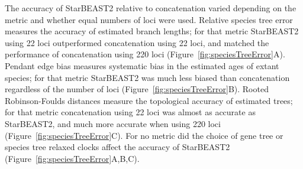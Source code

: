 \documentclass[12pt]{article}
\begin{document}
The accuracy of StarBEAST2 relative to concatenation varied depending on the
metric and whether equal numbers of loci were used. Relative species tree error
measures the accuracy of estimated branch lengths; for that metric StarBEAST2
using 22 loci outperformed concatenation using 22 loci, and matched the
performance of concatenation using 220 loci
(Figure~\ref{fig:speciesTreeError}A). Pendant edge bias measures systematic bias
in the estimated ages of extant species; for that metric StarBEAST2 was much
less biased than concatenation regardless of the number of loci
(Figure~\ref{fig:speciesTreeError}B). Rooted Robinson-Foulds distances measure
the topological accuracy of estimated trees; for that metric concatenation using
22 loci was almost as accurate as StarBEAST2, and much more accurate when using
220 loci (Figure~\ref{fig:speciesTreeError}C). For no metric did the choice of
gene tree or species tree relaxed clocks affect the accuracy of StarBEAST2
(Figure~\ref{fig:speciesTreeError}A,B,C).
\end{document}
